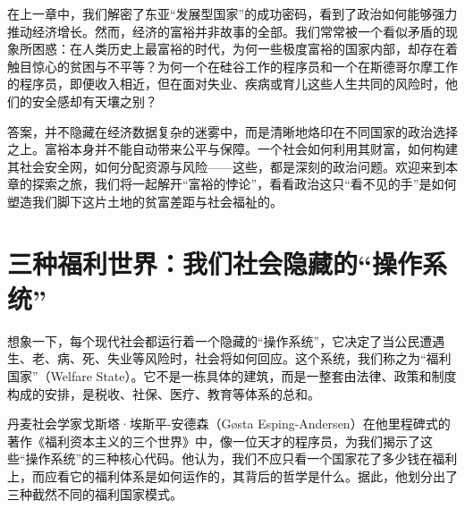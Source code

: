 \documentclass[a5paper, 11pt, openany]{ctexbook}
\begin{document}
在上一章中，我们解密了东亚“发展型国家”的成功密码，看到了政治如何能够强力推动经济增长。然而，经济的富裕并非故事的全部。我们常常被一个看似矛盾的现象所困惑：在人类历史上最富裕的时代，为何一些极度富裕的国家内部，却存在着触目惊心的贫困与不平等？为何一个在硅谷工作的程序员和一个在斯德哥尔摩工作的程序员，即便收入相近，但在面对失业、疾病或育儿这些人生共同的风险时，他们的安全感却有天壤之别？

答案，并不隐藏在经济数据复杂的迷雾中，而是清晰地烙印在不同国家的政治选择之上。富裕本身并不能自动带来公平与保障。一个社会如何利用其财富，如何构建其社会安全网，如何分配资源与风险——这些，都是深刻的政治问题。欢迎来到本章的探索之旅，我们将一起解开“富裕的悖论”，看看政治这只“看不见的手”是如何塑造我们脚下这片土地的贫富差距与社会福祉的。

\section{三种福利世界：我们社会隐藏的“操作系统”}

想象一下，每个现代社会都运行着一个隐藏的“操作系统”，它决定了当公民遭遇生、老、病、死、失业等风险时，社会将如何回应。这个系统，我们称之为“福利国家”（Welfare State）。它不是一栋具体的建筑，而是一整套由法律、政策和制度构成的安排，是税收、社保、医疗、教育等体系的总和。

丹麦社会学家戈斯塔·埃斯平-安德森（Gøsta Esping-Andersen）在他里程碑式的著作《福利资本主义的三个世界》中，像一位天才的程序员，为我们揭示了这些“操作系统”的三种核心代码。他认为，我们不应只看一个国家花了多少钱在福利上，而应看它的福利体系是如何运作的，其背后的哲学是什么。据此，他划分出了三种截然不同的福利国家模式。
\end{document}
